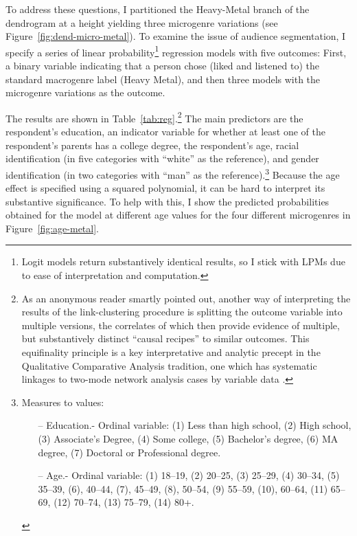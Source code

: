 \documentclass[a4paper,12pt]{extarticle}
\begin{document}
To address these questions, I partitioned the Heavy-Metal branch of the dendrogram at a height yielding three microgenre variations (see Figure~\ref{fig:dend-micro-metal}). To examine the issue of audience segmentation, I specify a series of linear probability\footnote{Logit models return substantively identical results, so I stick with LPMs due to ease of interpretation and computation.} regression models with five outcomes: First, a binary variable indicating that a person chose (liked and listened to) the standard macrogenre label (Heavy Metal), and then three models with the microgenre variations as the outcome. 

The results are shown in Table~\ref{tab:reg}.\footnote{As an anonymous reader smartly pointed out, another way of interpreting the results of the link-clustering procedure is splitting the outcome variable into multiple versions, the correlates of which then provide evidence of multiple, but substantively distinct ``causal recipes'' to similar outcomes. This equifinality principle is a key interpretative and analytic precept in the Qualitative Comparative Analysis tradition, one which has systematic linkages to two-mode network analysis cases by variable data \citep{breiger2014comparative}.} The main predictors are the respondent's education, an indicator variable for whether at least one of the respondent's parents has a college degree, the respondent's age, racial identification (in five categories with ``white'' as the reference), and gender identification (in two categories with ``man'' as the reference).\footnote{Measures to values:
    \begin{itemize}
        \item[--] Education.- Ordinal variable: (1) Less than high school, (2) High school, (3) Associate's Degree, (4) Some college, (5) Bachelor's degree, (6) MA degree, (7) Doctoral or Professional degree.
        \item[--] Age.- Ordinal variable: (1) 18--19, (2) 20--25, (3) 25--29, (4) 30--34, (5) 35--39, (6), 40--44, (7), 45--49, (8), 50--54, (9) 55--59, (10), 60--64, (11) 65--69, (12) 70--74, (13) 75--79, (14) 80+.
    \end{itemize}}
Because the age effect is specified using a squared polynomial, it can be hard to interpret its substantive significance. To help with this, I show the predicted probabilities obtained for the model at different age values for the four different microgenres in Figure~\ref{fig:age-metal}.
\end{document}

